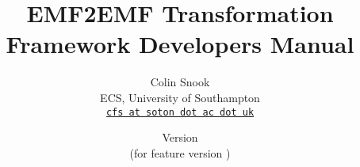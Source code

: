 \documentclass[a4paper,10pt]{article}
\title{EMF2EMF Transformation Framework Developers Manual}
\author{%
  Colin Snook\\%
  ECS, University of Southampton\\%
  \texttt{\href{mailto:cfs@ecs.soton.ac.uk}{cfs at soton dot ac dot uk}}%
}%
\date{%
  Version \EMFEMFManualVersion\\%
  (for feature version \EMFEMFFeatureVersion)\\
  \ifplastex
  \EMFEMFManualDate
  \else
  \displaydate{EMFEMFManualDate}%
  \fi
}
\begin{document}
\ifplastex%
\maketitle%
\else%
 \ifstandalone%
 \maketitle %
 \else%
 \fi%
\fi%











%


\end{document}
